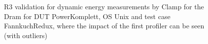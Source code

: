\begin{figure}
                            \caption{R3 validation for dynamic energy measurements by Clamp for the Dram for DUT PowerKomplett, OS Unix and test case FannkuchRedux, where the impact of the first profiler can be seen (with outliers)} \label{fig:PowerKomplett_Clamp_Dram_R3_dynamic_energy_with_outliers_Unix_avg_watts}
                            \end{figure}
                            